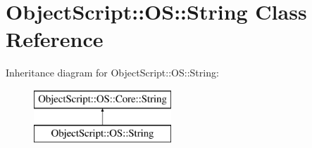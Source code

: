 \hypertarget{class_object_script_1_1_o_s_1_1_string}{}\section{Object\+Script\+:\+:OS\+:\+:String Class Reference}
\label{class_object_script_1_1_o_s_1_1_string}
Inheritance diagram for Object\+Script\+:\+:OS\+:\+:String\+:\begin{figure}[H]
\begin{center}
\leavevmode
\includegraphics[height=2.000000cm]{class_object_script_1_1_o_s_1_1_string}
\end{center}
\end{figure}
